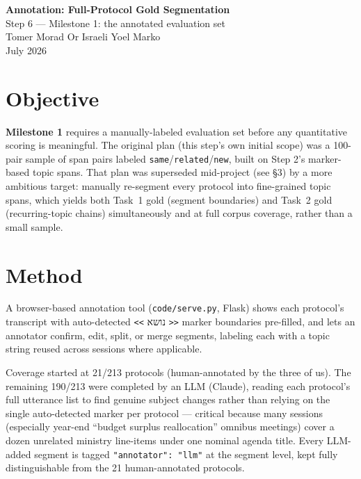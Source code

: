 \documentclass[11pt,a4paper]{article}
\begin{document}
\begin{center}
  {\LARGE \textbf{Annotation: Full-Protocol Gold Segmentation}}\\[0.3em]
  {\large Step 6 --- Milestone 1: the annotated evaluation set}\\[0.6em]
  {\normalsize Tomer Morad \quad Or Israeli \quad Yoel Marko}\\
  {\normalsize July 2026}
\end{center}

\vspace{0.5em}

\section{Objective}

\textbf{Milestone 1} requires a manually-labeled evaluation set before any quantitative
scoring is meaningful. The original plan (this step's own initial scope) was a 100-pair
sample of span pairs labeled \texttt{same}/\texttt{related}/\texttt{new}, built on Step 2's
marker-based topic spans. That plan was superseded mid-project (see \S3) by a more ambitious
target: manually re-segment every protocol into fine-grained topic spans, which yields both
Task~1 gold (segment boundaries) and Task~2 gold (recurring-topic chains) simultaneously and
at full corpus coverage, rather than a small sample.

\section{Method}

A browser-based annotation tool (\texttt{code/serve.py}, Flask) shows each protocol's
transcript with auto-detected \texttt{<{}<} \texthebrew{נושא} \texttt{>{}>} marker boundaries pre-filled, and lets
an annotator confirm, edit, split, or merge segments, labeling each with a topic string reused
across sessions where applicable.

Coverage started at 21/213 protocols (human-annotated by the three of us). The remaining
190/213 were completed by an LLM (Claude), reading each protocol's full utterance list to find
genuine subject changes rather than relying on the single auto-detected marker per protocol —
critical because many sessions (especially year-end ``budget surplus reallocation'' omnibus
meetings) cover a dozen unrelated ministry line-items under one nominal agenda title. Every
LLM-added segment is tagged \texttt{"annotator": "llm"} at the segment level, kept fully
distinguishable from the 21 human-annotated protocols.
\end{document}

